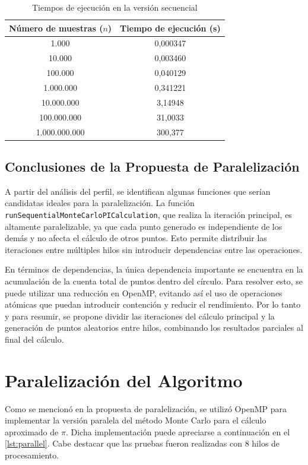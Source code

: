 \documentclass[a4paper, 10pt, onecolumn]{IEEEtran}
\begin{document}
\begin{table}[H]
  \centering
  \begin{tabular}{|c|c|}
    \hline
    \textbf{Número de muestras ($n$)} & \textbf{Tiempo de ejecución (s)} \\
    \hline
    1.000         & 0,000347 \\
    10.000        & 0,003460 \\
    100.000       & 0,040129 \\
    1.000.000     & 0,341221 \\
    10.000.000    & 3,14948 \\
    100.000.000   & 31,0033 \\
    1.000.000.000 & 300,377 \\
    \hline
  \end{tabular}
  \caption{Tiempos de ejecución en la versión secuencial}
  \label{tab:sequential_execution_times}
\end{table}

\subsection{Conclusiones de la Propuesta de Paralelización}
A partir del análisis del perfil, se identifican algunas funciones que serían candidatas ideales para la paralelización. La función \texttt{runSequentialMonteCarloPICalculation}, que realiza la iteración principal, es altamente paralelizable, ya que cada punto generado es independiente de los demás y no afecta el cálculo de otros puntos. Esto permite distribuir las iteraciones entre múltiples hilos sin introducir dependencias entre las operaciones.

En términos de dependencias, la única dependencia importante se encuentra en la acumulación de la cuenta total de puntos dentro del círculo. Para resolver esto, se puede utilizar una reducción en OpenMP, evitando así el uso de operaciones atómicas que puedan introducir contención y reducir el rendimiento. Por lo tanto y para resumir, se propone dividir las iteraciones del cálculo principal y la generación de puntos aleatorios entre hilos, combinando los resultados parciales al final del cálculo.

\section{Paralelización del Algoritmo}
Como se mencionó en la propuesta de paralelización, se utilizó OpenMP para implementar la versión paralela del método Monte Carlo para el cálculo aproximado de $\pi$. Dicha implementación puede apreciarse a continuación en el \cref{lst:parallel}. Cabe destacar que las pruebas fueron realizadas con 8 hilos de procesamiento.
\end{document}
